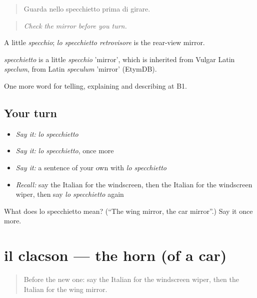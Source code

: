 \begin{quote}
Guarda nello specchietto prima di girare.
\end{quote}

\begin{quote}
\emph{Check the mirror before you turn.}
\end{quote}

A little \emph{specchio}; \emph{lo specchietto retrovisore} is the rear-view mirror.

\begin{cousinweb}
\emph{specchietto} is a little \emph{specchio} 'mirror', which is inherited from Vulgar Latin \emph{speclum}, from Latin \emph{speculum} 'mirror' (EtymDB).
\end{cousinweb}

\begin{grammarlens}[title={What you've built}]
One more word for telling, explaining and describing at B1.
\end{grammarlens}

\subsection*{Your turn}
\begin{itemize}
\raggedright
  \item \emph{Say it:} \emph{lo specchietto}
  \item \emph{Say it:} \emph{lo specchietto}, once more
  \item \emph{Say it:} a sentence of your own with \emph{lo specchietto}
  \item \emph{Recall:} say the Italian for the windscreen, then the Italian for the windscreen wiper, then say \emph{lo specchietto} again
\end{itemize}

\begin{tcolorbox}[breakable,colback=teal!4,colframe=teal!35!black,title={Before you move on}]
What does lo specchietto mean? (\textquotedblleft{}The wing mirror, the car mirror\textquotedblright{}.) Say it once more.
\end{tcolorbox}
\section[il clacson]{il clacson — the horn (of a car)}

\label{lesson:IT-C407-clacson}



\begin{quote}
Before the new one: say the Italian for the windscreen wiper, then the Italian for the wing mirror.
\end{quote}

